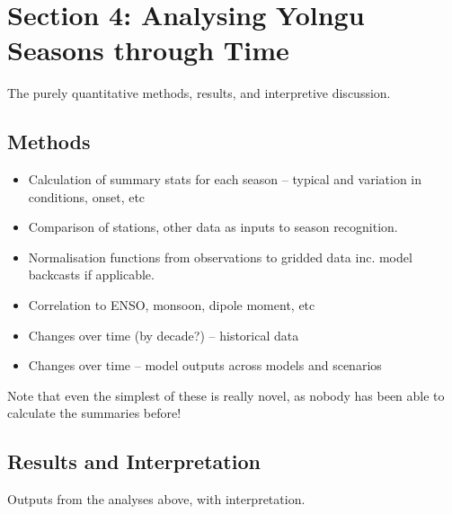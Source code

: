 \chapter{Section 4:  Analysing Yolngu Seasons through Time}
The purely quantitative methods, results, and interpretive discussion.

\section{Methods}

\begin{itemize}
\item Calculation of summary stats for each season – typical and variation in conditions, onset, etc
\item Comparison of stations, other data as inputs to season recognition.
\item Normalisation functions from observations to gridded data inc. model backcasts if applicable.
\item Correlation to ENSO, monsoon, dipole moment, etc
\item Changes over time (by decade?) – historical data
\item Changes over time – model outputs across models and scenarios
\end{itemize}

Note that even the simplest of these is really novel, as nobody has been able to calculate the summaries before!

\section{Results and Interpretation}
Outputs from the analyses above, with interpretation.

